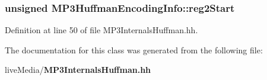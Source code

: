 \subsubsection[{reg2\+Start}]{\setlength{\rightskip}{0pt plus 5cm}unsigned M\+P3\+Huffman\+Encoding\+Info\+::reg2\+Start}\label{classMP3HuffmanEncodingInfo_ae01362939a667727c079891322fdcf28}


Definition at line 50 of file M\+P3\+Internals\+Huffman.\+hh.



The documentation for this class was generated from the following file\+:\begin{DoxyCompactItemize}
\item 
live\+Media/{\bf M\+P3\+Internals\+Huffman.\+hh}\end{DoxyCompactItemize}

